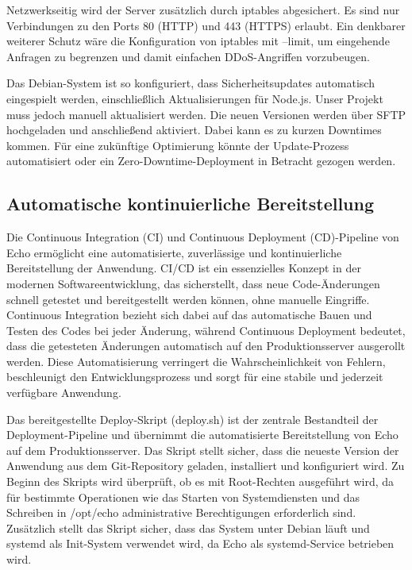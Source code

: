 \documentclass[a4paper,12pt]{article}
\begin{document}
Netzwerkseitig wird der Server zusätzlich durch iptables abgesichert. Es sind
nur Verbindungen zu den Ports 80 (HTTP) und 443 (HTTPS) erlaubt. Ein denkbarer
weiterer Schutz wäre die Konfiguration von iptables mit --limit, um eingehende
Anfragen zu begrenzen und damit einfachen DDoS-Angriffen vorzubeugen.

Das Debian-System ist so konfiguriert, dass Sicherheitsupdates automatisch
eingespielt werden, einschließlich Aktualisierungen für Node.js. Unser Projekt
muss jedoch manuell aktualisiert werden. Die neuen Versionen werden über SFTP
hochgeladen und anschließend aktiviert. Dabei kann es zu kurzen Downtimes
kommen. Für eine zukünftige Optimierung könnte der Update-Prozess automatisiert
oder ein Zero-Downtime-Deployment in Betracht gezogen werden.

\subsection{Automatische kontinuierliche Bereitstellung}
Die Continuous Integration (CI) und Continuous Deployment (CD)-Pipeline von
Echo ermöglicht eine automatisierte, zuverlässige und kontinuierliche
Bereitstellung der Anwendung. CI/CD ist ein essenzielles Konzept in der
modernen Softwareentwicklung, das sicherstellt, dass neue Code-Änderungen
schnell getestet und bereitgestellt werden können, ohne manuelle Eingriffe.
Continuous Integration bezieht sich dabei auf das automatische Bauen und Testen
des Codes bei jeder Änderung, während Continuous Deployment bedeutet, dass die
getesteten Änderungen automatisch auf den Produktionsserver ausgerollt werden.
Diese Automatisierung verringert die Wahrscheinlichkeit von Fehlern,
beschleunigt den Entwicklungsprozess und sorgt für eine stabile und jederzeit
verfügbare Anwendung.

Das bereitgestellte Deploy-Skript (deploy.sh) ist der zentrale Bestandteil der
Deployment-Pipeline und übernimmt die automatisierte Bereitstellung von Echo
auf dem Produktionsserver. Das Skript stellt sicher, dass die neueste Version
der Anwendung aus dem Git-Repository geladen, installiert und konfiguriert
wird. Zu Beginn des Skripts wird überprüft, ob es mit Root-Rechten ausgeführt
wird, da für bestimmte Operationen wie das Starten von Systemdiensten und das
Schreiben in /opt/echo administrative Berechtigungen erforderlich sind.
Zusätzlich stellt das Skript sicher, dass das System unter Debian läuft und
systemd als Init-System verwendet wird, da Echo als systemd-Service betrieben
wird.
\end{document}
